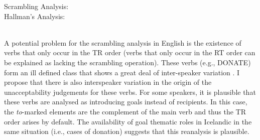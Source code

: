 \begin{exe}
\ex \label{ex:comparison-trees}
\begin{xlist}
\ex Scrambling Analysis: \\
 \ex\label{ex:hallman-tree} Hallman's Analysis: \\
\\
\end{xlist}
\end{exe}%

A potential problem for the scrambling analysis in English is the existence of verbs that only occur in the TR order (verbs that only occur in the RT order can be explained as lacking the scrambling operation). These verbs (e.g., DONATE) form an ill defined class that shows a great deal of inter-speaker variation \citep{Levin.1993}. I propose that there is also interspeaker variation in the origin of the unacceptability judgements for these verbs. For some speakers, it is plausible that these verbs are analysed as introducing goals instead of recipients. In this case, the \textit{to}-marked elements are the complement of the main verb and thus the TR order arises by default. The availability of goal thematic roles in Icelandic in the same situation (i.e., cases of donation) suggests that this reanalysis is plausible.


